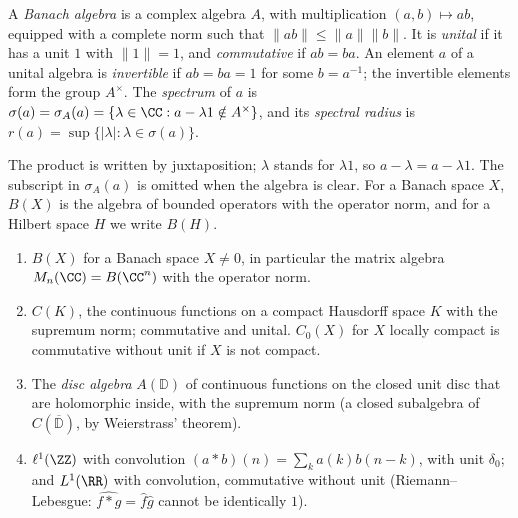 \begin{definition}\label{operator-algebras:definition-banach-algebra}
A \emph{Banach algebra} is a complex algebra $A$, with multiplication $(a, b) \mapsto ab$, equipped with a complete norm such that $\|ab\| \leq \|a\|\|b\|$. It is \emph{unital} if it has a unit $1$ with $\|1\| = 1$, and
\emph{commutative} if $ab = ba$. An element $a$ of a unital algebra is \emph{invertible} if $ab = ba = 1$ for some $b = a^{-1}$; the invertible elements form the group $A^\times$. The \emph{spectrum} of $a$ is
$\sigma(a) = \sigma_A(a) = \{\lambda \in \CC : a - \lambda1 \notin A^\times\}$, and its \emph{spectral radius} is $r(a) = \sup\{|\lambda| : \lambda \in \sigma(a)\}$.
\end{definition}

\begin{notation}\label{operator-algebras:notation-banach-algebra}
The product is written by juxtaposition; $\lambda$ stands for $\lambda1$, so $a - \lambda = a - \lambda1$. The subscript in $\sigma_A(a)$ is omitted when the algebra is clear. For a Banach space $X$, $B(X)$ is the
algebra of bounded operators with the operator norm, and for a Hilbert space $H$ we write $B(H)$.
\end{notation}

\begin{example}\label{operator-algebras:example-banach-algebras}
\begin{enumerate}
\item $B(X)$ for a Banach space $X \neq 0$, in particular the matrix algebra $M_n(\CC) = B(\CC^n)$ with the operator norm.
\item $C(K)$, the continuous functions on a compact Hausdorff space $K$ with the supremum norm; commutative and unital. $C_0(X)$ for $X$ locally compact is commutative without unit if $X$ is not compact.
\item The \emph{disc algebra} $A(\mathbb{D})$ of continuous functions on the closed unit disc that are holomorphic inside, with the supremum norm (a closed subalgebra of $C(\overline{\mathbb{D}})$, by Weierstrass' theorem).
\item $\ell^1(\ZZ)$ with convolution $(a * b)(n) = \sum_ka(k)b(n - k)$, with unit $\delta_0$; and $L^1(\RR)$ with convolution, commutative without unit (Riemann--Lebesgue: $\widehat{f * g} = \hat f\hat g$ cannot be identically $1$).
\end{enumerate}
\end{example}

